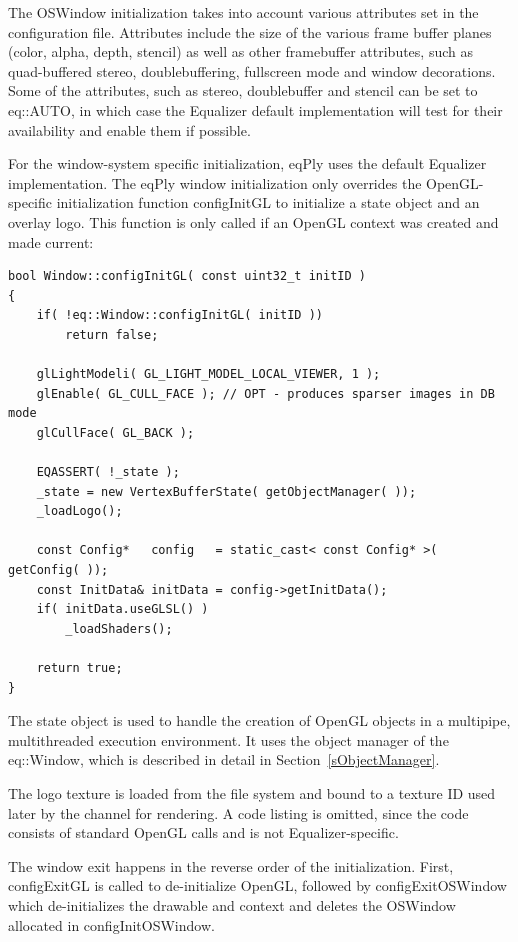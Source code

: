 \documentclass[10pt,a4]{scrartcl}
\newcommand{\sref}[1]{Section~\ref{#1}}
\begin{document}
The \textsf{OSWindow} initialization takes into account various
attributes set in the configuration file. Attributes include the size of
the various frame buffer planes (color, alpha, depth, stencil) as well
as other framebuffer attributes, such as quad-buffered stereo,
doublebuffering, fullscreen mode and window decorations. Some of the
attributes, such as stereo, doublebuffer and stencil can be set to
\textsf{eq::AUTO}, in which case the Equalizer default implementation
will test for their availability and enable them if possible.

For the window-system specific initialization, \textsf{eqPly} uses the
default Equalizer implementation. The \textsf{eqPly} window
initialization only overrides the OpenGL-specific initialization
function \textsf{configInitGL} to initialize a state object and
an overlay logo. This function is only called if an OpenGL context was
created and made current:

{\footnotesize\begin{lstlisting}
bool Window::configInitGL( const uint32_t initID )
{
    if( !eq::Window::configInitGL( initID ))
        return false;

    glLightModeli( GL_LIGHT_MODEL_LOCAL_VIEWER, 1 );
    glEnable( GL_CULL_FACE ); // OPT - produces sparser images in DB mode
    glCullFace( GL_BACK );

    EQASSERT( !_state );
    _state = new VertexBufferState( getObjectManager( ));
    _loadLogo();

    const Config*   config   = static_cast< const Config* >( getConfig( ));
    const InitData& initData = config->getInitData();
    if( initData.useGLSL() )
        _loadShaders();

    return true;
}
\end{lstlisting}}%

The state object is used to handle the creation of OpenGL objects in a
multipipe, multithreaded execution environment. It uses the object
manager of the \textsf{eq::Window}, which is described in detail in
\sref{sObjectManager}.

The logo texture is loaded from the file system and bound to a texture
ID used later by the channel for rendering. A code listing is omitted,
since the code consists of standard OpenGL calls and is not
Equalizer-specific.

The window exit happens in the reverse order of the
initialization. First, \textsf{configExitGL} is called to de-initialize
OpenGL, followed by \textsf{configExitOSWindow} which de-initializes the
drawable and context and deletes the \textsf{OSWindow} allocated in
\textsf{configInitOSWindow}.
\end{document}
